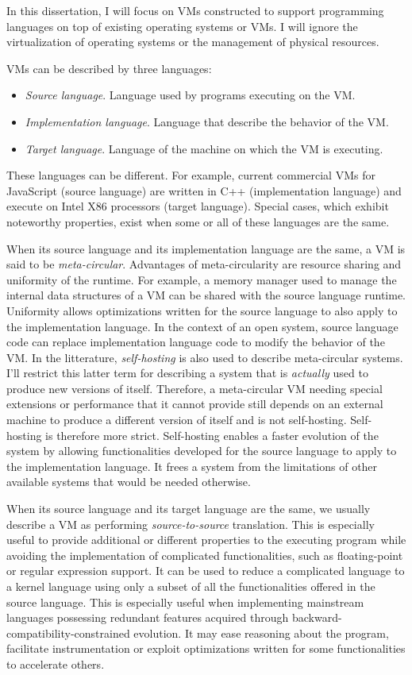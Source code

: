 In this dissertation, I will focus on VMs constructed to support programming
languages on top of existing operating systems or VMs. I will ignore the
virtualization of operating systems or the management of physical resources.

VMs can be described by three languages:
\begin{itemize}
    \item \textit{Source language}. Language used by programs executing on the VM.
    \item \textit{Implementation language}. Language that describe the behavior of the VM.
    \item \textit{Target language}. Language of the machine on which the VM is executing.
\end{itemize}
These languages can be different. For example, current commercial VMs for
JavaScript (source language) are written in C++ (implementation language) and
execute on Intel X86 processors (target language). Special cases, which exhibit
noteworthy properties, exist when some or all of these languages are the same. 

When its source language and its implementation language are the same, a VM is
said to be \textit{meta-circular}. Advantages of meta-circularity are resource
sharing and uniformity of the runtime. For example, a memory manager used to
manage the internal data structures of a VM can be shared with the source
language runtime. Uniformity allows optimizations written for the source
language to also apply to the implementation language. In the context of an
open system, source language code can replace implementation language code to
modify the behavior of the VM. In the litterature, \textit{self-hosting} is
also used to describe meta-circular systems. I'll restrict this latter term for
describing a system that is \textit{actually} used to produce new versions of
itself.  Therefore, a meta-circular VM needing special extensions or
performance that it cannot provide still depends on an external machine to
produce a different version of itself and is not self-hosting. Self-hosting is
therefore more strict.  Self-hosting enables a faster evolution of the system
by allowing functionalities developed for the source language to apply to the
implementation language. It frees a system from the limitations of other
available systems that would be needed otherwise.

When its source language and its target language are the same, we usually
describe a VM as performing \textit{source-to-source} translation. This is
especially useful to provide additional or different properties to the
executing program while avoiding the implementation of complicated
functionalities, such as floating-point or regular expression support.  It can
be used to reduce a complicated language to a kernel language using only a
subset of all the functionalities offered in the source language. This is
especially useful when implementing mainstream languages possessing redundant
features acquired through backward-compatibility-constrained evolution. It may
ease reasoning about the program, facilitate instrumentation or exploit
optimizations written for some functionalities to accelerate others.

